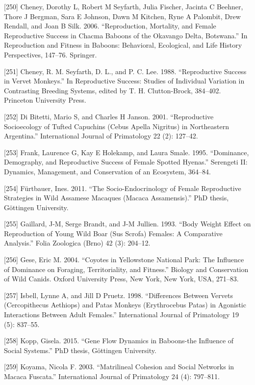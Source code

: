 \documentclass[
]{article}
\begin{document}
{[}250{]} Cheney, Dorothy L, Robert M Seyfarth, Julia Fischer, Jacinta C
Beehner, Thore J Bergman, Sara E Johnson, Dawn M Kitchen, Ryne A
Palombit, Drew Rendall, and Joan B Silk. 2006. ``Reproduction,
Mortality, and Female Reproductive Success in Chacma Baboons of the
Okavango Delta, Botswana.'' In Reproduction and Fitness in Baboons:
Behavioral, Ecological, and Life History Perspectives, 147--76.
Springer.

{[}251{]} Cheney, R. M. Seyfarth, D. L., and P. C. Lee. 1988.
``Reproductive Success in Vervet Monkeys.'' In Reproductive Success:
Studies of Individual Variation in Contrasting Breeding Systems, edited
by T. H. Clutton-Brock, 384--402. Princeton University Press.

{[}252{]} Di Bitetti, Mario S, and Charles H Janson. 2001.
``Reproductive Socioecology of Tufted Capuchins (Cebus Apella Nigritus)
in Northeastern Argentina.'' International Journal of Primatology 22
(2): 127--42.

{[}253{]} Frank, Laurence G, Kay E Holekamp, and Laura Smale. 1995.
``Dominance, Demography, and Reproductive Success of Female Spotted
Hyenas.'' Serengeti II: Dynamics, Management, and Conservation of an
Ecosystem, 364--84.

{[}254{]} Fürtbauer, Ines. 2011. ``The Socio-Endocrinology of Female
Reproductive Strategies in Wild Assamese Macaques (Macaca Assamensis).''
PhD thesis, Göttingen University.

{[}255{]} Gaillard, J-M, Serge Brandt, and J-M Jullien. 1993. ``Body
Weight Effect on Reproduction of Young Wild Boar (Sus Scrofa) Females: A
Comparative Analysis.'' Folia Zoologica (Brno) 42 (3): 204--12.

{[}256{]} Gese, Eric M. 2004. ``Coyotes in Yellowstone National Park:
The Influence of Dominance on Foraging, Territoriality, and Fitness.''
Biology and Conservation of Wild Canids. Oxford University Press, New
York, New York, USA, 271--83.

{[}257{]} Isbell, Lynne A, and Jill D Pruetz. 1998. ``Differences
Between Vervets (Cercopithecus Aethiops) and Patas Monkeys (Erythrocebus
Patas) in Agonistic Interactions Between Adult Females.'' International
Journal of Primatology 19 (5): 837--55.

{[}258{]} Kopp, Gisela. 2015. ``Gene Flow Dynamics in Baboons-the
Influence of Social Systems.'' PhD thesis, Göttingen University.

{[}259{]} Koyama, Nicola F. 2003. ``Matrilineal Cohesion and Social
Networks in Macaca Fuscata.'' International Journal of Primatology 24
(4): 797--811.
\end{document}

